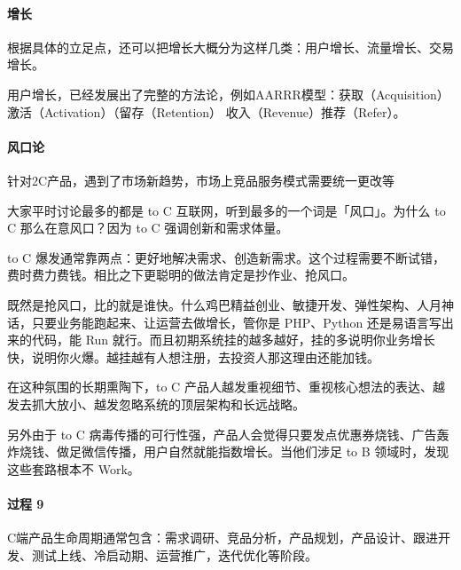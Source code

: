 \documentclass[letterpaper,11pt,english]{sphinxmanual}
\begin{document}
\paragraph{增长}
\label{\detokenize{chapter_introduction/2C:id7}}
根据具体的立足点，还可以把增长大概分为这样几类：用户增长、流量增长、交易增长。

用户增长，已经发展出了完整的方法论，例如AARRR模型：获取（Acquisition）\sphinxhyphen{}
激活（Activation）\sphinxhyphen{}（留存（Retention）\sphinxhyphen{} 收入（Revenue）\sphinxhyphen{}推荐（Refer）。


\paragraph{风口论}
\label{\detokenize{chapter_introduction/2C:id8}}
针对2C产品，遇到了市场新趋势，市场上竞品服务模式需要统一更改等
%
\begin{footnote}[34]\sphinxAtStartFootnote
{}
%
\end{footnote}

大家平时讨论最多的都是 to C 互联网，听到最多的一个词是「风口」。为什么
to C 那么在意风口？因为 to C 强调创新和需求体量。

to C
爆发通常靠两点：更好地解决需求、创造新需求。这个过程需要不断试错，费时费力费钱。相比之下更聪明的做法肯定是抄作业、抢风口。

既然是抢风口，比的就是谁快。什么鸡巴精益创业、敏捷开发、弹性架构、人月神话，只要业务能跑起来、让运营去做增长，管你是
PHP、Python 还是易语言写出来的代码，能 Run
就行。而且初期系统挂的越多越好，挂的多说明你业务增长快，说明你火爆。越挂越有人想注册，去投资人那这理由还能加钱。

在这种氛围的长期熏陶下，to C
产品人越发重视细节、重视核心想法的表达、越发去抓大放小、越发忽略系统的顶层架构和长远战略。

另外由于 to C
病毒传播的可行性强，产品人会觉得只要发点优惠券烧钱、广告轰炸烧钱、做足微信传播，用户自然就能指数增长。当他们涉足
to B 领域时，发现这些套路根本不 Work。


\paragraph{过程 9\sphinxfootnotemark[35]}
\label{\detokenize{chapter_introduction/2C:id9}}%
\begin{footnotetext}[35]\sphinxAtStartFootnote
{}
%
\end{footnotetext}\ignorespaces 
C端产品生命周期通常包含：需求调研、竞品分析，产品规划，产品设计、跟进开发、测试上线、冷启动期、运营推广，迭代优化等阶段。
\end{document}
